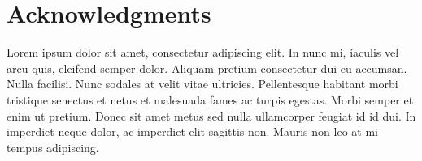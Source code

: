 
\cleardoublepage
\pagestyle{empty}
\begin{abstractpage}

\end{abstractpage}

% 

\cleardoublepage


\section*{Acknowledgments}

Lorem ipsum dolor sit amet, consectetur adipiscing elit. In nunc mi, iaculis vel arcu quis, eleifend semper dolor. Aliquam pretium consectetur dui eu accumsan. Nulla facilisi. Nunc sodales at velit vitae ultricies. Pellentesque habitant morbi tristique senectus et netus et malesuada fames ac turpis egestas. Morbi semper et enim ut pretium. Donec sit amet metus sed nulla ullamcorper feugiat id id dui. In imperdiet neque dolor, ac imperdiet elit sagittis non. Mauris non leo at mi tempus adipiscing. 
\cleardoublepage